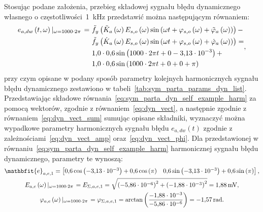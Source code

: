 Stosując podane założenia, przebieg składowej sygnału błędu dynamicznego własnego o częstotliwości~\qty{1}{kHz} przedstawić można następującym równaniem:
\begin{equation}
\begin{split}
e_{a,dw} \left(t,\omega\right) \left|_{\omega = 1000 \cdot 2 \pi} \right. =~
& \tilde{f}_{y} \left(\tilde{K}_{a} \left(\omega\right) E_{s,o} \left(\omega\right) \sin \left( \omega t + \varphi_{s,o} \left(\omega\right) + \tilde{\varphi}_{a} \left(\omega\right) \right)\right) - \\
& \tilde{f}_{y} \left(\dot{K}_{a} \left(\omega\right) E_{s,o} \left(\omega\right) \sin \left( \omega t + \varphi_{s,o} \left(\omega\right) + \dot{\varphi}_{a} \left(\omega\right) \right)\right) = \\
& \num{1.0} \cdot \num{0.6} \sin \left( 1000 \cdot 2 \pi t + 0 - \num{3.13e-3} \right) + \\
& \num{1.0} \cdot \num{0.6} \sin \left( 1000 \cdot 2 \pi t + 0 + 0 + \pi \right)
\end{split}
\label{eq:sym_parta_dyn_self_example_harm},
\end{equation}
przy czym opisane w podany sposób parametry kolejnych harmonicznych sygnału błędu dynamicznego zestawiono w tabeli~\ref{tab:sym_parta_params_dyn_list}. Przedstawiając składowe równania~\eqref{eq:sym_parta_dyn_self_example_harm} za pomocą wektorów, zgodnie z równaniem~\eqref{eq:dyn_vect}, a następnie zgodnie z równaniem~\eqref{eq:dyn_vect_sum} sumując opisane składniki, wyznaczyć można wypadkowe parametry harmonicznych sygnału błędu $e_{a,dw}(t)$ zgodnie z zależnościami~\eqref{eq:dyn_vect_amp} oraz~\eqref{eq:dyn_vect_phi}. Dla przedstawionej w równaniu~\eqref{eq:sym_parta_dyn_self_example_harm} harmonicznej sygnału błędu dynamicznego, parametry te wynoszą:
\begin{gather}
\mathbfit{e}_{a,e,1} =
\begin{bmatrix}
\num{0.6} \cos \emb{\num{-3.13e-3}} + \num{0.6} \cos \emb{\pi} & \num{0.6} \sin \emb{\num{-3.13e-3}} + \num{0.6} \sin \emb{\pi}
\end{bmatrix}
\label{eq:sym_parta_dyn_self_example_sum}, \\
E_{a,e} \emb{\omega}\left|_{\omega = 1000 \cdot 2 \pi}\right. = E_{\Sigma,a,e,1} = \sqrt{\emb{\num{-5.86e-6}}^{2} + \emb{\num{-1.88e-3}}^{2}} = \qty{1.88}{mV} \label{eq:sym_parta_dyn_self_example_amp}, \\
\varphi_{a,e} \emb{\omega}\left|_{\omega = 1000 \cdot 2 \pi}\right. = \varphi_{\Sigma,a,e,1} = \arctan \emb{\frac{\num{-1.88e-3}}{\num{-5.86e-6}}} = \qty{-1.57}{rad} \label{eq:sym_parta_dyn_self_example_phi}.
\end{gather}
